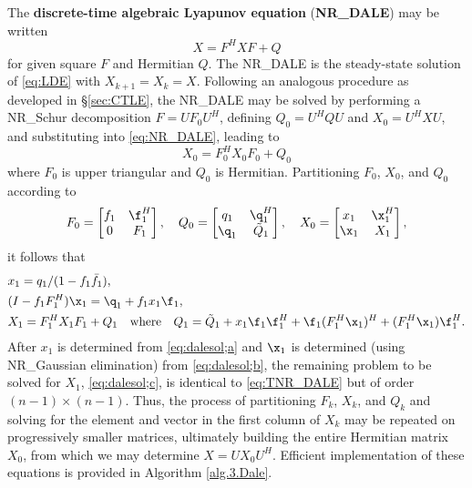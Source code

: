 The {\bf discrete-time algebraic Lyapunov equation} ({\bf NR_DALE}) may be written
\begin{equation}
X = F^H X F + Q
\label{eq:NR_DALE}
\end{equation}
for given square $F$ and Hermitian $Q$.  The NR_DALE is the steady-state solution of \eqref{eq:LDE} with $X_{k+1}=X_k=X$.
Following an analogous procedure as developed in \S \ref{sec:CTLE}, the NR_DALE may be solved by performing a NR_Schur decomposition $F=U F_0 U^{H}$,
defining $Q_0=U^H Q U$ and $X_0=U^H X U$, and substituting into \eqref{eq:NR_DALE}, leading to 
\begin{equation}
X_0 = F_0^H X_0 F_0 + Q_0
\label{eq:TNR_DALE}
\end{equation}
where $F_0$ is upper triangular and $Q_0$ is Hermitian.  Partitioning $F_0$, $X_0$, and $Q_0$ according to
\begin{equation*}
   F_0=\begin{bmatrix} f_1 & \f_1^H \\ 0 & F_1 \end{bmatrix}, \quad
   Q_0=\begin{bmatrix} q_1 & \q_1^H \\ \q_1 & \tilde Q_1 \end{bmatrix}, \quad
   X_0=\begin{bmatrix} x_1 & \x_1^H \\ \x_1 & X_1 \end{bmatrix},
\end{equation*}
it follows that
\begin{subequations}
\label{eq:dalesol}
\begin{align}
 &x_1 = q_1 / (1-f_1 \bar f_1),     \label{eq:dalesol;a} \\
 &(I - f_1 F_1^H) \x_1 = \q_1 + f_1 x_1 \f_1, \label{eq:dalesol;b}\\
 &X_1 = F_1^H X_1 F_1 + Q_1 \quad \textrm{where} \quad Q_1 = \tilde Q_1 + x_1 \f_1 \f_1^H + \f_1 (F_1^H \x_1)^H + (F_1^H \x_1) \f_1^H.  \label{eq:dalesol;c}
\end{align}
\end{subequations}
After $x_1$ is determined from \eqref{eq:dalesol;a} and $\x_1$ is determined (using NR_Gaussian elimination) from \eqref{eq:dalesol;b},
the remaining problem to be solved for $X_1$, \eqref{eq:dalesol;c}, is identical to \eqref{eq:TNR_DALE} but of order $(n-1)\times (n-1)$.  
Thus, the process of partitioning $F_k$, $X_k$, and $Q_k$ and solving for the element and vector in the first
column of $X_k$ may be repeated on progressively smaller matrices, ultimately building
the entire Hermitian matrix $X_0$, from which we may determine $X = U X_0 U^H$.  Efficient implementation of these equations
is provided in Algorithm \ref{alg.3.Dale}.

